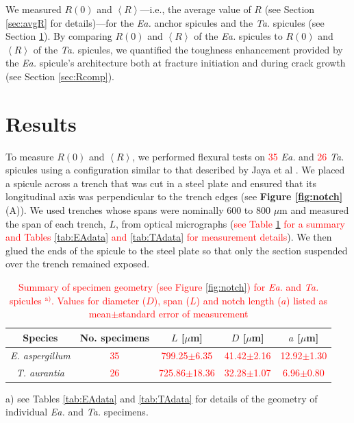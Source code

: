 \documentclass[12pt,onecolumn]{article}
\makeatletter
\newcommand{\TA}{\textit{Ta.\@}\xspace}
\newcommand{\EA}{\textit{Ea.\@}\xspace}
\newcommand{\ra}[1]{\renewcommand{\arraystretch}{#1}}
\makeatother
\begin{document}
\begin{bibunit}
We measured $R(0)$ and $\left< R \right>$---i.e., the average value of $R$ (see Section \ref{sec:avgR} for details)---for the \EA anchor spicules and the \TA spicules (see Section \ref{sec:res}). By comparing $R(0)$ and $\left< R \right>$ of the \EA spicules to $R(0)$ and $\left< R \right>$ of the \TA spicules, we quantified the toughness enhancement provided by the \EA spicule's architecture both at fracture initiation and during crack growth (see Section \ref{sec:Rcomp}).

\section{Results}
\label{sec:res}
To measure $R(0)$ and $\left< R \right>$, we performed flexural tests on \textcolor{red}{35} \EA and \textcolor{red}{26} \TA spicules using a configuration similar to that described  by Jaya et al \cite{jaya2012new,jaya2014crack,jaya2015can}. We placed a spicule across a trench that was cut in a steel plate and ensured that its longitudinal axis was perpendicular to the trench edges (see {\bf Figure \ref{fig:notch}} (A)). We used trenches whose spans were nominally 600 to 800 $\mu$m and measured the span of each trench, $L$, from optical micrographs (\textcolor{red}{see Table \ref{tab:spiculegeom} for a summary and Tables \ref{tab:EAdata} and \ref{tab:TAdata} for measurement details}). We then glued the ends of the spicule to the steel plate so that only the section suspended over the trench remained exposed. 
%
\begin{table}
\centering
\caption{\textcolor{red}{Summary of specimen geometry (see Figure \ref{fig:notch}) for \EA and \TA spicules $^\text{a)}$. Values for diameter ($D$), span ($L$) and notch length ($a$) listed as mean$\pm$standard error of measurement}}
\label{tab:spiculegeom}
\ra{1.25}
\begin{threeparttable}[t]
\begin{tabular}{ccccc}
\toprule
Species & No. specimens & $L$ [$\mu$m] & $D$ [$\mu$m] & $a$ [$\mu$m]\\
\midrule
\textit{E. aspergillum} & \textcolor{red}{35} & \textcolor{red}{799.25$\pm$6.35} & \textcolor{red}{41.42$\pm$2.16} & \textcolor{red}{12.92$\pm$1.30}\\
\textit{T. aurantia} & \textcolor{red}{26} & \textcolor{red}{725.86$\pm$18.36} & \textcolor{red}{32.28$\pm$1.07} & \textcolor{red}{6.96$\pm$0.80}\\
\bottomrule
\end{tabular}
\begin{tablenotes}
\item[a)] {\footnotesize see Tables \ref{tab:EAdata} and \ref{tab:TAdata} for details of the geometry of individual \EA and \TA specimens.}
\end{tablenotes}
\end{threeparttable}
\end{table}


\end{bibunit}
\end{document}
